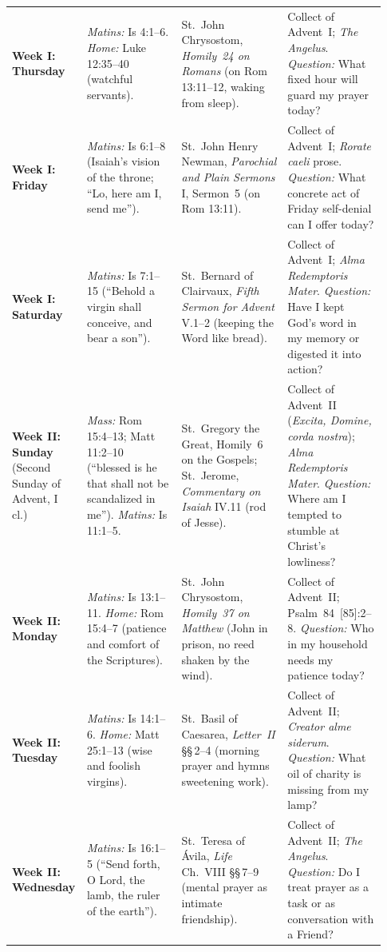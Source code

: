 {\begin{longtable}{>{\raggedright\arraybackslash}p{0.14\linewidth}>{\raggedright\arraybackslash}p{0.25\linewidth}>{\raggedright\arraybackslash}p{0.28\linewidth}>{\raggedright\arraybackslash}p{0.26\linewidth}}
\textbf{Week I: Thursday} & \textit{Matins:} Is 4:1--6. \textit{Home:} Luke 12:35--40 (watchful servants). & St.~John Chrysostom, \textit{Homily~24 on Romans} (on Rom 13:11--12, waking from sleep). & Collect of Advent~I; \textit{The Angelus}. \textit{Question:} What fixed hour will guard my prayer today?\\
\textbf{Week I: Friday} & \textit{Matins:} Is 6:1--8 (Isaiah's vision of the throne; ``Lo, here am I, send me''). & St.~John Henry Newman, \textit{Parochial and Plain Sermons} I, Sermon~5 (on Rom 13:11). & Collect of Advent~I; \textit{Rorate caeli} prose. \textit{Question:} What concrete act of Friday self-denial can I offer today?\\
\textbf{Week I: Saturday} & \textit{Matins:} Is 7:1--15 (``Behold a virgin shall conceive, and bear a son''). & St.~Bernard of Clairvaux, \textit{Fifth Sermon for Advent} V.1--2 (keeping the Word like bread). & Collect of Advent~I; \textit{Alma Redemptoris Mater}. \textit{Question:} Have I kept God's word in my memory or digested it into action?\\
\textbf{Week II: Sunday} (Second Sunday of Advent, I cl.) & \textit{Mass:} Rom 15:4--13; Matt 11:2--10 (``blessed is he that shall not be scandalized in me''). \textit{Matins:} Is 11:1--5. & St.~Gregory the Great, Homily~6 on the Gospels; St.~Jerome, \textit{Commentary on Isaiah} IV.11 (rod of Jesse). & Collect of Advent~II (\textit{Excita, Domine, corda nostra}); \textit{Alma Redemptoris Mater}. \textit{Question:} Where am I tempted to stumble at Christ's lowliness?\\
\textbf{Week II: Monday} & \textit{Matins:} Is 13:1--11. \textit{Home:} Rom 15:4--7 (patience and comfort of the Scriptures). & St.~John Chrysostom, \textit{Homily~37 on Matthew} (John in prison, no reed shaken by the wind). & Collect of Advent~II; Psalm~84~[85]:2--8. \textit{Question:} Who in my household needs my patience today?\\
\textbf{Week II: Tuesday} & \textit{Matins:} Is 14:1--6. \textit{Home:} Matt 25:1--13 (wise and foolish virgins). & St.~Basil of Caesarea, \textit{Letter~II} \S\S\,2--4 (morning prayer and hymns sweetening work). & Collect of Advent~II; \textit{Creator alme siderum}. \textit{Question:} What oil of charity is missing from my lamp?\\
\textbf{Week II: Wednesday} & \textit{Matins:} Is 16:1--5 (``Send forth, O Lord, the lamb, the ruler of the earth''). & St.~Teresa of \'Avila, \textit{Life} Ch.~VIII \S\S\,7--9 (mental prayer as intimate friendship). & Collect of Advent~II; \textit{The Angelus}. \textit{Question:} Do I treat prayer as a task or as conversation with a Friend?\\

\end{longtable}}
